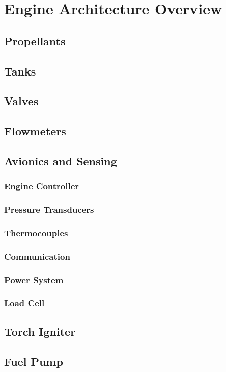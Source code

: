 \documentclass[12pt, letterpaper]{article}
\begin{document}
\section{Engine Architecture Overview}
\subsection{Propellants}
\subsection{Tanks}
\subsection{Valves}
\subsection{Flowmeters}
\subsection{Avionics and Sensing}
\subsubsection{Engine Controller}
\subsubsection{Pressure Transducers}
\subsubsection{Thermocouples}
\subsubsection{Communication}
\subsubsection{Power System}
\subsubsection{Load Cell}
\subsection{Torch Igniter}
\subsection{Fuel Pump}
\end{document}
